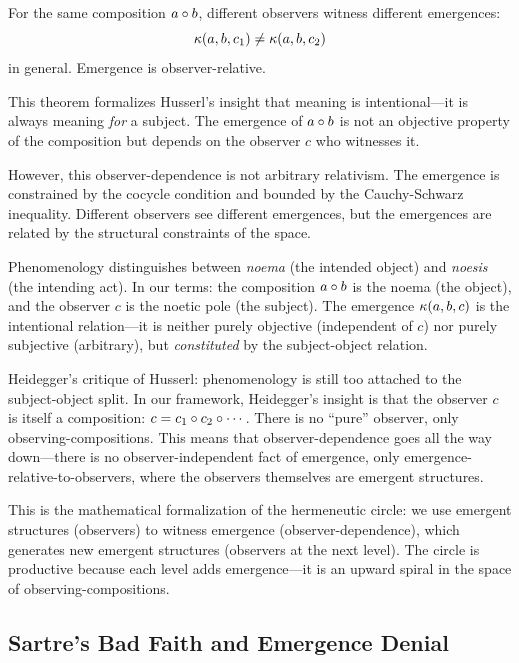 \begin{theorem}
\label{thm:observer-emergence}
For the same composition $a \circ b$, different observers witness different
emergences:
\[
  \kappa(a, b, c_1) \neq \kappa(a, b, c_2)
\]
in general. Emergence is observer-relative.
\end{theorem}

\begin{interpretation}
This theorem formalizes Husserl's insight that meaning is intentional---it is
always meaning \emph{for} a subject. The emergence of $a \circ b$ is not an
objective property of the composition but depends on the observer $c$ who witnesses
it.

However, this observer-dependence is not arbitrary relativism. The emergence is
constrained by the cocycle condition and bounded by the Cauchy-Schwarz inequality.
Different observers see different emergences, but the emergences are related by
the structural constraints of the space.

Phenomenology distinguishes between \emph{noema} (the intended object) and
\emph{noesis} (the intending act). In our terms: the composition $a \circ b$
is the noema (the object), and the observer $c$ is the noetic pole (the subject).
The emergence $\kappa(a,b,c)$ is the intentional relation---it is neither purely
objective (independent of $c$) nor purely subjective (arbitrary), but
\emph{constituted} by the subject-object relation.

Heidegger's critique of Husserl: phenomenology is still too attached to the
subject-object split. In our framework, Heidegger's insight is that the observer
$c$ is itself a composition: $c = c_1 \circ c_2 \circ \cdots$. There is
no ``pure'' observer, only observing-compositions. This means that observer-dependence
goes all the way down---there is no observer-independent fact of emergence,
only emergence-relative-to-observers, where the observers themselves are emergent
structures.

This is the mathematical formalization of the hermeneutic circle: we use
emergent structures (observers) to witness emergence (observer-dependence), which
generates new emergent structures (observers at the next level). The circle is
productive because each level adds emergence---it is an upward spiral in the
space of observing-compositions.
\end{interpretation}

\subsection{Sartre's Bad Faith and Emergence Denial}

